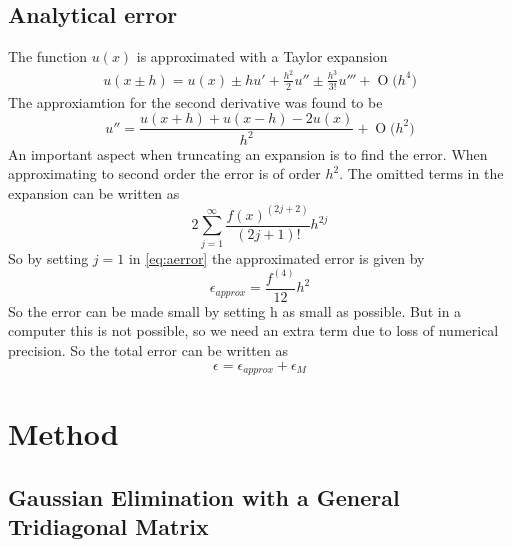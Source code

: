 \documentclass[12pt]{article}
\numberwithin{equation}{section}     %
\newcommand{\BigO}[1]{\ensuremath{\operatorname{O}\bigl(#1\bigr)}}
\begin{document}
\subsection{Analytical error}
The function $u(x)$ is approximated with a Taylor expansion
\begin{align*}
    u(x\pm h)=u(x)\pm hu'+\frac{h^{2}}{2}u''\pm \frac{h^{3}}{3!}u'''+\BigO{h^{4}}
\end{align*}
The approxiamtion for the second derivative was found to be
\begin{equation*}
    u''=\frac{u(x+h)+u(x-h)-2u(x)}{h^{2}}+\BigO{h^{2}}
\end{equation*}
An important aspect when truncating an expansion is to find the error. When approximating to second order the error is of order $h^{2}$. The omitted terms in the expansion can be written as
\begin{equation}\label{eq:aerror}
    2\sum_{j=1}^{\infty}\frac{f(x)^{(2j+2)}}{(2j+1)!}h^{2j}
\end{equation}
So by setting $j=1$ in \eqref{eq:aerror} the approximated error is given by
\begin{equation}
    \epsilon_{approx}=\frac{f^{(4)}}{12}h^{2}
\end{equation}
So the error can be made small by setting h as small as possible. But in a computer this is not possible, so we need an extra term due to loss of numerical precision. So the total error can be written as
\begin{equation*}
    \epsilon=\epsilon_{approx}+\epsilon_{M}
\end{equation*}




\section{Method}
\subsection{Gaussian Elimination with a General Tridiagonal Matrix}
\end{document}
